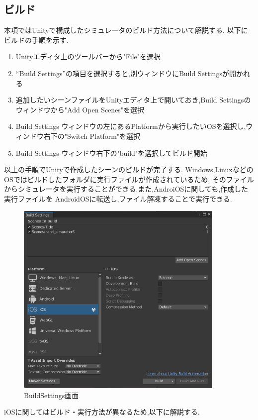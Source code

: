\documentclass{ltjsreport}
\begin{document}
		\subsection{ビルド}
			本項ではUnityで構成したシミュレータのビルド方法について解説する.
			以下にビルドの手順を示す.
			\begin{enumerate}
				\item Unityエディタ上のツールバーから"File"を選択
				\item ``Build Settings''の項目を選択すると,別ウィンドウにBuild Settingsが開かれる
				\item 追加したいシーンファイルをUnityエディタ上で開いておき,Build Settingsのウィンドウから"Add Open Scenes"を選択
				\item Build Settings ウィンドウの左にあるPlatformから実行したいOSを選択し,ウィンドウ右下の"Switch Platform"を選択
				\item Build Settings ウィンドウ右下の"build"を選択してビルド開始
			\end{enumerate}
			以上の手順でUnityで作成したシーンのビルドが完了する.
			Windows,LinuxなどのOSではビルドしたフォルダに実行ファイルが作成されているため,
			そのファイルからシミュレータを実行することができる.また,AndroiOSに関しても,作成した実行ファイルを
			AndroidOSに転送し,ファイル解凍することで実行できる.

			\begin{figure}[H]
			\centering
			\includegraphics[width = 10cm]{../figs/BuildSettings.png}
			\caption{BuildSettings画面}
			\label{fig:BuildSettings}
			\end{figure}
\vspace{-15pt}
			iOSに関してはビルド・実行方法が異なるため,以下に解説する.
\end{document}
